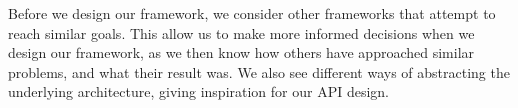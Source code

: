 Before we design our framework, we consider other frameworks that attempt to reach similar goals. This allow us to make more informed decisions when we design our framework, as we then know how others have approached similar problems, and what their result was. We also see different ways of abstracting the underlying architecture, giving inspiration for our API design.

